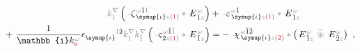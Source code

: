 \begin{subequations}
\begin{align}
	\mathcolor{gray}{k^\nabla_{\check{1}}} \left( \Xint{\begin{smallmatrix} ~ \\ {}^{}_{\mathcolor{gray}{-}} \\ ~ \end{smallmatrix}}{12}{\zeta}^{\;\! \mathcolor{gray}{\omega} \hat{1} \mathcolor{gray}{\check{1}}}_{\;\! \symup{\iota} \mathcolor{gray}{z} \textcolor{Maroon}{(1)}} \mathcolor{gray}{*} \Xint{\mathcolor{gray}{-}}{295}{E}^{\;\!\mathcolor{gray}{\omega}}_{\;\! \hat{1} \mathcolor{gray}{z}} \right) &+ \Xint{\begin{smallmatrix} ~ \\ {}^{}_{\mathcolor{gray}{-}} \\ ~ \end{smallmatrix}}{16}{\varepsilon}^{\;\! \mathcolor{gray}{\omega} \hat{1}}_{\;\! \symup{\iota} \mathcolor{gray}{z} \textcolor{Maroon}{(1)}} \mathcolor{gray}{*} \Xint{\mathcolor{gray}{-}}{295}{E}^{\;\!\mathcolor{gray}{\omega}}_{\;\! \hat{1} \mathcolor{gray}{z}}  \label{eq:nonlinear(2)-wave_wkrho-simplify1} \\ 
	+~ \frac{1}{\mathbb{i} k_{\textcolor{Maroon}{\mathsf{o}}}^{\;\! \mathcolor{gray}{\omega}}} \epsilon^{\hphantom{\symup{\iota}}\mathcolor{gray}{\dot{1}}\dot{2}}_{\symup{\iota}} \mathcolor{gray}{k^\nabla_{\dot{1}}} \mathcolor{gray}{k^\nabla_{\check{1}}} \left( \Xint{\begin{smallmatrix} ~ \\ {}^{}_{\mathcolor{gray}{-}} \\ ~ \end{smallmatrix}}{13}{\varsigma}^{\;\! \mathcolor{gray}{\omega} \hat{1} \mathcolor{gray}{\check{1}}}_{\;\! \dot{2} \mathcolor{gray}{z} \textcolor{Maroon}{(1)}} \mathcolor{gray}{*} \Xint{\mathcolor{gray}{-}}{295}{E}^{\;\!\mathcolor{gray}{\omega}}_{\;\! \hat{1} \mathcolor{gray}{z}} \right) &= - ~\Xint{{}^{}_{\mathcolor{gray}{-}}}{23}{\chi}^{\;\! \mathcolor{gray}{\omega} \hat{1} \hat{2}}_{\;\! \symup{\iota} \mathcolor{gray}{z} \textcolor{Maroon}{(2)}} \mathcolor{gray}{*} \left( \Xint{\mathcolor{gray}{-}}{295}{E}^{\;\!\mathcolor{gray}{\omega}}_{\;\! \hat{1} \mathcolor{gray}{z}} ~\mathcolor{gray}{\widetilde \circledast}~ \Xint{\mathcolor{gray}{-}}{295}{E}^{\;\!\mathcolor{gray}{\omega}}_{\;\! \hat{2} \mathcolor{gray}{z}} \right)~, \label{eq:nonlinear(2)-wave_wkrho-simplify1-2}
\end{align}
\end{subequations}
